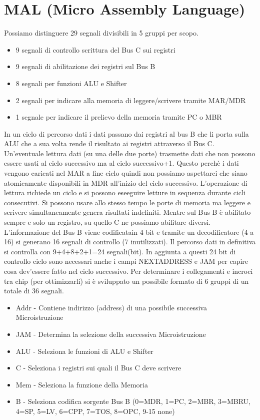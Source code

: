 \section{MAL (Micro Assembly Language)}
Possiamo distinguere 29 segnali divisibili in 5 gruppi per scopo.
\begin{itemize}
\item 9 segnali di controllo scrittura del Bus C sui registri
\item 9 segnali di abilitazione dei registri sul Bus B
\item 8 segnali per funzioni ALU e Shifter
\item 2 segnali per indicare alla memoria di leggere/scrivere tramite MAR/MDR
\item 1 segnale per indicare il prelievo della memoria tramite PC o MBR
\end{itemize}
In un ciclo di percorso dati i dati passano dai registri al bus B che li porta sulla ALU che a sua volta rende il risultato ai registri attraverso il Bus C. Un'eventuale lettura dati (su una delle due porte) trasmette dati che non possono essere usati al ciclo successivo ma al ciclo successivo+1. Questo perchè i dati vengono caricati nel MAR a fine ciclo quindi non possiamo aspettarci che siano atomicamente disponibili in MDR all'inizio del ciclo successivo. L'operazione di lettura richiede un ciclo e si possono eseeguire letture in sequenza durante cicli consecutivi. Si possono usare allo stesso tempo le porte di memoria ma leggere e scrivere simultaneamente genera risultati indefiniti. Mentre sul Bus B è abilitato sempre e solo un registro, su quello C ne possiamo abilitare diversi. L'informazione del Bus B viene codificatain 4 bit e tramite un decodificatore (4 a 16) si generano 16 segnali di controllo (7 inutilizzati).
Il percorso dati in definitiva si controlla con 9+4+8+2+1=24 segnali(bit). In aggiunta a questi 24 bit di controllo ciclo sono necessari anche i campi NEXTADDRESS e JAM per capire cosa dev'essere fatto nel ciclo successivo. Per determinare i collegamenti e incroci tra chip (per ottimizzarli) si è sviluppato un possibile formato di 6 gruppi di un totale di 36 segnali.
\begin{itemize}
\item Addr - Contiene indirizzo (address) di una possibile successiva Microistruzione
\item JAM - Determina la selezione della successiva Microistruzione
\item ALU - Seleziona le funzioni di ALU e Shifter
\item C - Seleziona i registri sui quali il Bus C deve scrivere
\item Mem - Seleziona la funzione della Memoria
\item B - Seleziona codifica sorgente Bus B (0=MDR, 1=PC, 2=MBR, 3=MBRU, 4=SP, 5=LV, 6=CPP, 7=TOS, 8=OPC, 9-15 none)
\end{itemize}
